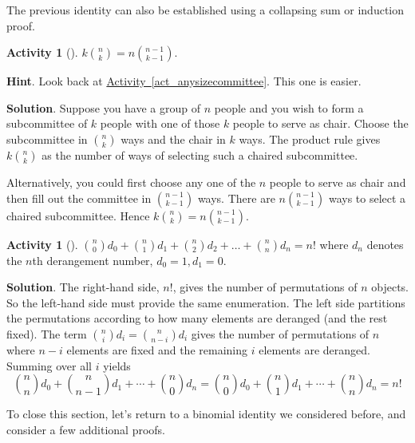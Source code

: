 \documentclass[10pt,]{book}
\theoremstyle{plain}
\theoremstyle{definition}
\theoremstyle{definition}
\theoremstyle{definition}
\newtheorem{activity}[project]{Activity}
\theoremstyle{definition}
\numberwithin{equation}{chapter}
\begin{document}
\hypertarget{p-633}{}%
The previous identity can also be established using a collapsing sum or induction proof.%
\begin{activity}[]\label{activity-49}
\hypertarget{p-634}{}%
\(k \binom{n}{k} = n \binom{n - 1}{k - 1}\).%
\par\smallskip%
\noindent\textbf{Hint}.\hypertarget{hint-37}{}\quad%
\hypertarget{p-635}{}%
Look back at \hyperref[act_anysizecommittee]{Activity~\ref{act_anysizecommittee}}.  This one is easier.%
\par\smallskip%
\noindent\textbf{Solution}.\hypertarget{solution-57}{}\quad%
\hypertarget{p-636}{}%
Suppose you have a group of \(n\) people and you wish to form a subcommittee of \(k\) people with one of those \(k\) people to serve as chair. Choose the subcommittee in \(\binom{n}{k}\) ways and the chair in \(k\) ways. The product rule gives \(k \binom{n}{k}\) as the number of ways of selecting such a chaired subcommittee.%
\par
\hypertarget{p-637}{}%
Alternatively, you could first choose any one of the \(n\) people to serve as chair and then fill out the committee in \(\binom{n - 1}{k - 1}\) ways. There are \(n \binom{n - 1}{k - 1}\) ways to select a chaired subcommittee. Hence \(k \binom{n}{k} = n \binom{n - 1}{k - 1}\).%
\end{activity}
\begin{activity}[]\label{activity-50}
\hypertarget{p-638}{}%
\(\binom{n}{0} d_{0} + \binom{n}{1} d_{1} + \binom{n}{2} d_{2} + \ldots + \binom{n}{n} d_{n} = n!\) where \(d_{n}\) denotes the \(n\)th derangement number, \(d_{0} = 1,d_{1} = 0\).%
\par\smallskip%
\noindent\textbf{Solution}.\hypertarget{solution-58}{}\quad%
\hypertarget{p-639}{}%
The right-hand side, \(n!\), gives the number of permutations of \(n\) objects. So the left-hand side must provide the same enumeration. The left side partitions the permutations according to how many elements are deranged (and the rest fixed). The term \(\binom{n}{i} d_{i} = \binom{n}{n - i} d_{i}\) gives the number of permutations of \(n\) where \(n - i\) elements are fixed and the remaining \(i\) elements are deranged. Summing over all \(i\) yields%
\begin{equation*}
\binom{n}{n} d_{0} + \binom{n}{n - 1} d_{1} + \cdots + \binom{n}{0} d_{n} = \binom{n}{0} d_{0} + \binom{n}{1} d_{1} + \cdots + \binom{n}{n} d_{n} = n!
\end{equation*}
%
\end{activity}
\hypertarget{p-640}{}%
To close this section, let's return to a binomial identity we considered before, and consider a few additional proofs.%
\end{document}
